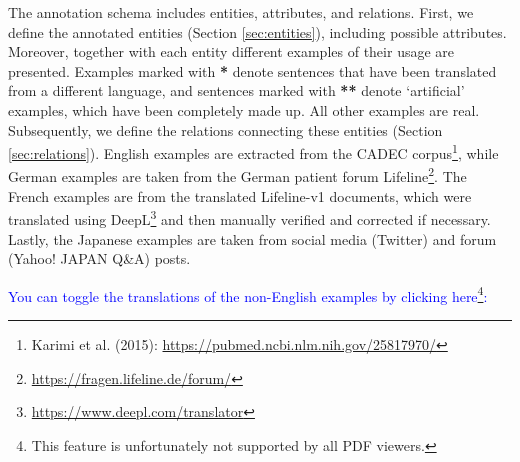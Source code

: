 \documentclass[12pt]{article}
\theoremstyle{definition}
\begin{document}

The annotation schema includes entities, attributes, and relations. First, we define the annotated entities (Section \ref{sec:entities}), including possible attributes. Moreover, together with each entity different examples of their usage are presented. Examples marked with \textbf{*} denote sentences that have been translated from a different language, and sentences marked with \textbf{**} denote `artificial' examples, which have been completely made up. All other examples are real.
Subsequently, we define the relations connecting these entities (Section \ref{sec:relations}).
English examples are extracted from the CADEC corpus\footnote{Karimi et al. (2015): \url{https://pubmed.ncbi.nlm.nih.gov/25817970/}}, while German examples are taken from the German patient forum Lifeline\footnote{\url{https://fragen.lifeline.de/forum/}}.
The French examples are from the translated Lifeline-v1 documents, which were translated using DeepL\footnote{\url{https://www.deepl.com/translator}} and then manually verified and corrected if necessary.
Lastly, the Japanese examples are taken from social media (Twitter) and forum (Yahoo! JAPAN Q\&A) posts.


\textcolor{blue}{You can toggle the translations of the non-English examples by clicking here\footnote{This feature is unfortunately not supported by all PDF viewers.}:}

\begin{center}
\begin{tcolorbox}[hbox]
\end{tcolorbox}
\end{center}
\end{document}
